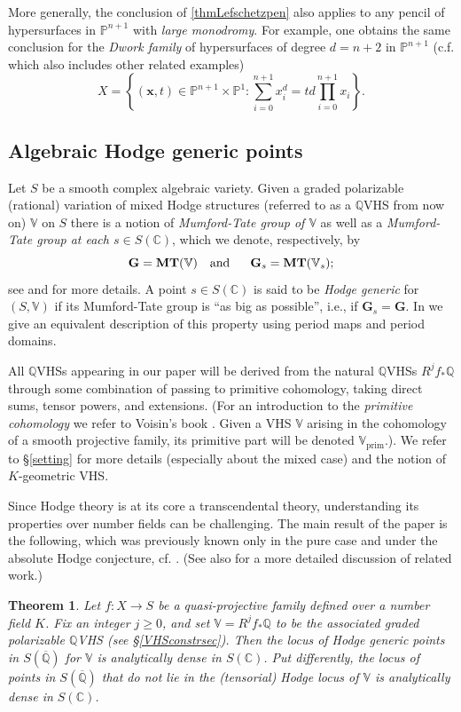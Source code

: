 \documentclass[10pt]{article}
\numberwithin{equation}{section}
\theoremstyle{plain}
\newtheorem{thm}{Theorem}[section]
\theoremstyle{definition}
\theoremstyle{remark}
\newcommand{\MT}{\mathbf{MT}}
\newcommand{\C}{\mathbb{C}}
\newcommand{\Qbar}{\overline{\mathbb{Q}}}
\newcommand{\Q}{\mathbb{Q}}
\newcommand{\V}{\mathbb{V}}
\begin{document}
More generally, the conclusion of \autoref{thmLefschetzpen} also applies to any pencil of hypersurfaces in $\mathbb{P}^{n+1}$ with \emph{large monodromy}. For example, one obtains the same conclusion for the \emph{Dwork family} of hypersurfaces of degree $d=n+2$ in $\mathbb{P}^{n+1}$ (c.f. \cite[Thm. 8.6]{zbMATH05778253} which also includes other related examples)
\[
X = \left\{ (\mathbf{x}, t) \in \mathbb{P}^{n+1} \times \mathbb{P}^1 : \sum_{i=0}^{n+1} x_i^d = t d \prod_{i=0}^{n+1} x_i \right\} .
\]

\subsection{Algebraic Hodge generic points}
\label{Hodgegenptssec}
Let $S$ be a smooth complex algebraic variety. Given a graded polarizable (rational) variation of mixed Hodge structures (referred to as a $\Q$VHS from now on) $\V$ on $S$ there is a notion of \emph{Mumford-Tate group of $\V$} as well as a \emph{Mumford-Tate group at each $s\in S(\C)$}, which we denote, respectively, by
\begin{displaymath}
\mathbf{G}=\MT(\V) \\ \ \ \text{  and } \ \ \ \     \mathbf{G}_s=\MT(\V_s);
\end{displaymath}
see  and \cite{2021arXiv210708838B} for more details. A point $s\in S(\C)$ is said to be \emph{Hodge generic} for $(S,\V)$ if its Mumford-Tate group is ``as big as possible'', i.e., if $ \mathbf{G}_s= \mathbf{G}$. In  we give an equivalent description of this property using period maps and period domains.

All $\mathbb{Q}$VHSs appearing in our paper will be derived from the natural $\mathbb{Q}$VHSs $R^jf_*\Q$ through some combination of passing to primitive cohomology, taking direct sums, tensor powers, and extensions. (For an introduction to the \emph{primitive cohomology} we refer to Voisin's book \cite{zbMATH05221670}. Given a VHS $\V$ arising in the cohomology of a smooth projective family, its primitive part will be denoted $\V_{\operatorname{prim}}$.). We refer to \S \ref{setting} for more details (especially about the mixed case) and the notion of $K$-geometric VHS.




Since Hodge theory is at its core a transcendental theory, understanding its properties over number fields can be challenging. The main result of the paper is the following, which was previously known only in the pure case and under the absolute Hodge conjecture, cf. \cite[Thm. 1.11]{zbMATH06492665}. (See also  for a more detailed discussion of related work.)
\begin{thm}
\label{mainhodgegenthm}
Let $f : X \to S$ be a quasi-projective family defined over a number field $K$. Fix an integer $j \geq 0$, and set $\V = R^{j} f_{*} \mathbb{Q}$ to be the associated graded polarizable $\mathbb{Q}$VHS (see \S\ref{VHSconstrsec}). Then the locus of Hodge generic points in $S(\Qbar)$ for $\V$ is analytically dense in $S(\mathbb{C})$. Put differently, the locus of points in $S(\Qbar)$ that do not lie in the (tensorial) Hodge locus of $\V$ is analytically dense in $S(\mathbb{C})$.
\end{thm}
\end{document}
